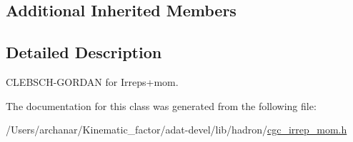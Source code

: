 \subsection*{Additional Inherited Members}


\subsection{Detailed Description}
C\+L\+E\+B\+S\+C\+H-\/\+G\+O\+R\+D\+AN for Irreps+mom. 

The documentation for this class was generated from the following file\+:\begin{DoxyCompactItemize}
\item 
/\+Users/archanar/\+Kinematic\+\_\+factor/adat-\/devel/lib/hadron/\mbox{\hyperlink{adat-devel_2lib_2hadron_2cgc__irrep__mom_8h}{cgc\+\_\+irrep\+\_\+mom.\+h}}\end{DoxyCompactItemize}
